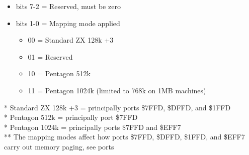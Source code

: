 \begin{itemize}
\item bits 7-2 = Reserved, must be zero
\item bits 1-0 = Mapping mode applied
  \begin{itemize}
  \item 00 = Standard ZX 128k +3
  \item 01 = Reserved
  \item 10 = Pentagon 512k
  \item 11 = Pentagon 1024k (limited to 768k on 1MB machines)
  \end{itemize}
\end{itemize}
* Standard ZX 128k +3 = principally ports \$7FFD, \$DFFD, and \$1FFD\\
* Pentagon 512k = principally port \$7FFD\\
* Pentagon 1024k = principally ports \$7FFD and \$EFF7\\
** The mapping modes affect how ports \$7FFD, \$DFFD, \$1FFD, and \$EFF7
carry out memory paging, see ports

